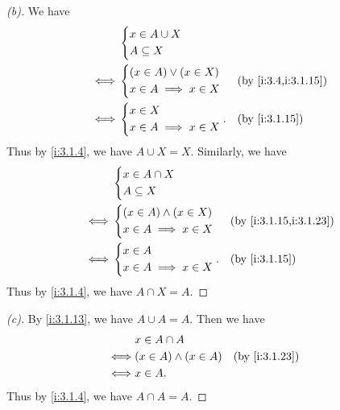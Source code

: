 \begin{proof}[(b)]
  We have
  \begin{align*}
         & \begin{dcases}
             x \in A \cup X \\
             A \subseteq X
           \end{dcases}                        \\
    \iff & \begin{dcases}
             (x \in A) \lor (x \in X) \\
             x \in A \implies x \in X
           \end{dcases} &  & \by{i:3.4,i:3.1.15} \\
    \iff & \begin{dcases}
             x \in X \\
             x \in A \implies x \in X
           \end{dcases}.    &  & \by{i:3.1.15}
  \end{align*}
  Thus by \cref{i:3.1.4}, we have \(A \cup X = X\).
  Similarly, we have
  \begin{align*}
         & \begin{dcases}
             x \in A \cap X \\
             A \subseteq X
           \end{dcases}                           \\
    \iff & \begin{dcases}
             (x \in A) \land (x \in X) \\
             x \in A \implies x \in X
           \end{dcases} &  & \by{i:3.1.15,i:3.1.23} \\
    \iff & \begin{dcases}
             x \in A \\
             x \in A \implies x \in X
           \end{dcases}.     &  & \by{i:3.1.15}
  \end{align*}
  Thus by \cref{i:3.1.4}, we have \(A \cap X = A\).
\end{proof}

\begin{proof}[(c)]
  By \cref{i:3.1.13}, we have \(A \cup A = A\).
  Then we have
  \begin{align*}
         & x \in A \cap A                               \\
    \iff & (x \in A) \land (x \in A) &  & \by{i:3.1.23} \\
    \iff & x \in A.
  \end{align*}
  Thus by \cref{i:3.1.4}, we have \(A \cap A = A\).
\end{proof}

